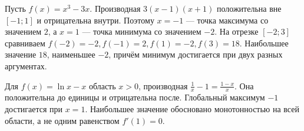 \ifdim\dimexpr\ht\CatFlowBox+\dp\CatFlowBox\relax<58mm\dp\CatFlowBox=\dimexpr58mm-\ht\CatFlowBox\relax\fi%
\noindent\usebox{\CatFlowBox}\par\addvspace{2pt}
\begin{example}Пусть \(f(x)=x^3-3x\). Производная \(3(x-1)(x+1)\) положительна вне \([-1;1]\) и отрицательна внутри. Поэтому \(x=-1\) --- точка максимума со значением \(2\), а \(x=1\) --- точка минимума со значением \(-2\). На отрезке \([-2;3]\) сравниваем \(f(-2)=-2,f(-1)=2,f(1)=-2,f(3)=18\). Наибольшее значение \(18\), наименьшее \(-2\), причём минимум достигается при двух разных аргументах.\end{example}
\begin{example}Для \(f(x)=\ln x-x\) область \(x>0\), производная \(\frac1x-1=\frac{1-x}x\). Она положительна до единицы и отрицательна после. Глобальный максимум \(-1\) достигается при \(x=1\). Наибольшее значение обосновано монотонностью на всей области, а не одним равенством \(f'(1)=0\).\end{example}
